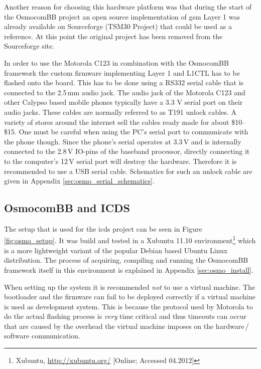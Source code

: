 Another reason for choosing this hardware platform was that during the start of the OsmocomBB project an open source implementation of \gls{gsm} Layer 1 was already available on Sourceforge (TSM30 Project) that could be used as a reference. 
At this point the original project has been removed from the Sourceforge site.

In order to use the Motorola C123 in combination with the OsmocomBB framework the custom firmware implementing Layer 1 and L1CTL has to be flashed onto the board.
This has to be done using a RS332 serial cable that is connected to the 2.5\,mm audio jack.
The audio jack of the Motorola C123 and other Calypso based mobile phones typically have a 3.3 V serial port on their audio jacks.
These cables are normally referred to as T191 unlock cables.
A variety of stores around the internet sell the cables ready made for about \$10--\$15.
One must be careful when using the PC's serial port to communicate with the phone though.
Since the phone's serial operates at 3.3\,V and is internally connected to the 2.8\,V IO-pins of the baseband processor, directly connecting it to the computer's 12\,V serial port will destroy the hardware.
Therefore it is recommended to use a USB serial cable.
Schematics for such an unlock cable are given in Appendix \ref{sec:osmo_serial_schematics}.

\subsection{OsmocomBB and ICDS}
The setup that is used for the \gls{icds} project can be seen in Figure \ref{fig:osmo_setup}.
It was build and tested in a Xubuntu 11.10 environment\footnote{Xubuntu, \url{http://xubuntu.org/} [Online; Accessed 04.2012]} which is a more lightweight variant of the popular Debian based Ubuntu Linux distribution.
The process of acquiring, compiling and running the OsmocomBB framework itself in this environment is explained in Appendix \ref{sec:osmo_install}.

When setting up the system it is recommended \emph{not} to use a virtual machine.
The bootloader and the firmware can fail to be deployed correctly if a virtual machine is used as development system.
This is because the protocol used by Motorola to do the actual flashing process is \emph{very} time critical and thus timeouts can occur that are caused by the overhead the virtual machine imposes on the hardware\,/\,software communication.


